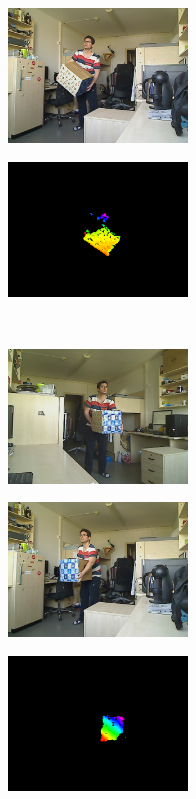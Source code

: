 \begin{figure}
\begin{subfigure}[b]{.32\linewidth}
	\includegraphics[width=135pt]{figures/scene3/right_196.png}
  \end{subfigure}
\begin{subfigure}[b]{.32\linewidth}
	\centering
	\includegraphics[width=135pt]{figures/scene3/vis_196.png}
  \end{subfigure}\\\vspace{5pt}
\begin{subfigure}[b]{.32\linewidth}
	\centering
	\includegraphics[width=135pt]{figures/scene3/left_376.png}
  \end{subfigure}
\begin{subfigure}[b]{.32\linewidth}
	\centering
	\includegraphics[width=135pt]{figures/scene3/right_376.png}
  \end{subfigure}
\begin{subfigure}[b]{.32\linewidth}
	\centering
	\includegraphics[width=135pt]{figures/scene3/vis_376.png}

\end{subfigure}
\end{figure}
